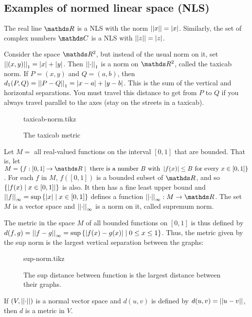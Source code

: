 \documentclass[../main-sheet.tex]{subfiles}
\begin{document}
\subsection{Examples of normed linear space (NLS)}
\begin{ex}
    The real line $ \R  $ is a NLS with the norm $ \left\vert\left\vert x\right\vert\right\vert=\left\vert x\right\vert $. Similarly, the set of complex numbers $ \C $ is a NLS with $ \left\vert\left\vert z\right\vert\right\vert=\left\vert z\right\vert $.
\end{ex}
\begin{ex}
    Consider the space $ \R^2 $, but instead of the usual norm on it, set $ \left\vert\left\vert(x,y)\right\vert\right\vert_1=\left\vert x\right\vert+\left\vert y\right\vert $. Then $ \left\vert\left\vert\cdot\right\vert\right\vert_1 $ is a norm on $ \R^2 $, called the taxicab norm. If $ P=(x,y) $ and $ Q=(a,b) $, then $ d_1(P,Q)=\left\vert\left\vert P-Q\right\vert\right\vert_1 =\left\vert x-a\right\vert+\left\vert y-b\right\vert$. This is the sum of the vertical and horizontal separations. You must travel this distance to get from $ P $ to $ Q $ if you always travel parallel to the axes (stay on the streets in a taxicab).
    \begin{figure}[H]
        \centering
        {taxicab-norm.tikz}
        \caption{The taxicab metric}
    \end{figure}
\end{ex}
\begin{ex}
    Let $ M= $ all real-valued functions on the interval $ [0,1] $ that are bounded. That is, let $ M=\set{f:[0,1]\to\R\mid \text{ there is a number $ B $ with }\abs{f(x)}\leq B \text{ for every }x\in[0,1]} $. For each $ f $ in $ M $, $ f([0,1]) $ is a bounded subset of $ \R $, and so $ \left\{\left\vert f(x)\mid x\in [0,1]\right\vert\right\} $ is also. It then has a fine least upper bound and $ \left\vert\left\vert f\right\vert\right\vert_{\infty}=\sup\left\{\left\vert x\right\vert\mid x\in[0,1]\right\}  $ defines a function $ \snorm{\cdot}:M\to\R $. The set $ M $ is a vector space and $ \left\vert\left\vert\cdot\right\vert\right\vert_\infty $ is a norm on it, called supremum norm.

    The metric in the space $ M $ of all bounded functions on $ [0,1] $ is thus defined by $ d(f,g)=\left\vert\left\vert f-g\right\vert\right\vert_{\infty}=\sup\left\{\left\vert f(x)-g(x)\right\vert\mid 0\leq x\leq 1\right\} $. Thus, the metric given by the sup norm is the largest vertical separation between the graphs:
    \begin{figure}[H]
        \centering
        {sup-norm.tikz}
        \caption{The sup distance between function is the largest distance between their graphs.}
    \end{figure}
\end{ex}
\begin{prop}
    If $ (V,\left\vert\left\vert\cdot\right\vert\right\vert) $ is a normal vector space and $ d(u,v) $ is defined by $ d(u,v)=\left\vert\left\vert u-v\right\vert\right\vert $, then $ d $ is a metric in $ V $.
\end{prop}
\end{document}
